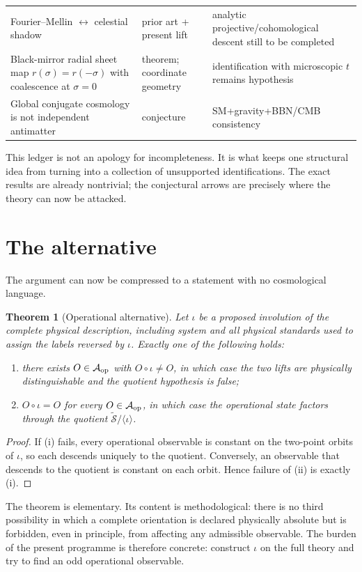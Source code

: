 \documentclass[11pt]{article}
\newtheorem{theorem}{Theorem}[section]
\theoremstyle{definition}\newtheorem{definition}[theorem]{Definition}
\theoremstyle{remark}\newtheorem{remark}[theorem]{Remark}\newtheorem{conjecture}[theorem]{Conjecture}
\begin{document}
\begin{longtable}{>{\raggedright\arraybackslash}p{} >{\raggedright\arraybackslash}p{} >{\raggedright\arraybackslash}p{}}
Fourier--Mellin $\leftrightarrow$ celestial shadow & prior art + present lift & analytic projective/cohomological descent still to be completed\\
Black-mirror radial sheet map $r(\sigma)=r(-\sigma)$ with coalescence at $\sigma=0$ & theorem; coordinate geometry & identification with microscopic $t$ remains hypothesis\\
Global conjugate cosmology is not independent antimatter & conjecture & SM+gravity+BBN/CMB consistency\\
\bottomrule
\end{longtable}

This ledger is not an apology for incompleteness. It is what keeps one structural idea from turning into a collection of unsupported identifications. The exact results are already nontrivial; the conjectural arrows are precisely where the theory can now be attacked.


\section{The alternative}
The argument can now be compressed to a statement with no cosmological language.

\begin{theorem}[Operational alternative]\label{thm:alternative}
Let $\iota$ be a proposed involution of the complete physical description, including system and all physical standards used to assign the labels reversed by $\iota$. Exactly one of the following holds:
\begin{enumerate}[label=(\roman*)]
 \item there exists $O\in\mathcal A_{\rm op}$ with $O\circ\iota\neq O$, in which case the two lifts are physically distinguishable and the quotient hypothesis is false;
 \item $O\circ\iota=O$ for every $O\in\mathcal A_{\rm op}$, in which case the operational state factors through the quotient $\widetilde{\mathcal S}/\langle\iota\rangle$.
\end{enumerate}
\end{theorem}
\begin{proof}
If (i) fails, every operational observable is constant on the two-point orbits of $\iota$, so each descends uniquely to the quotient. Conversely, an observable that descends to the quotient is constant on each orbit. Hence failure of (ii) is exactly (i).
\end{proof}

The theorem is elementary. Its content is methodological: there is no third possibility in which a complete orientation is declared physically absolute but is forbidden, even in principle, from affecting any admissible observable. The burden of the present programme is therefore concrete: construct $\iota$ on the full theory and try to find an odd operational observable.
\end{document}
